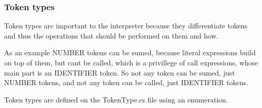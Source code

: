\subsubsection{Token types}

Token types are important to the interpreter because they differentiate tokens and thus the operations that should be
performed on them and how.


As an example NUMBER tokens can be sumed, because literal expressions build on top of them, but cant be called, which
is a privillege of call expressions, whose main part is an IDENTIFIER token.
So not any token can be sumed, just NUMBER tokens, and not any token can be called, just IDENTIFIER tokens.


Token types are defined on the TokenType.cs file using an enumeration.

